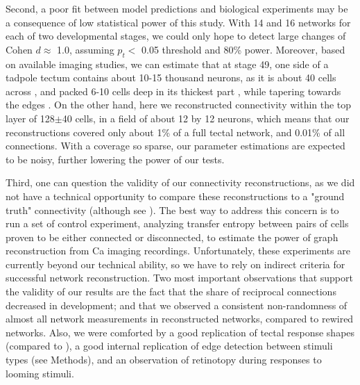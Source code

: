 \documentclass{article}
\begin{document}
Second, a poor fit between model predictions and biological experiments may be a consequence of low statistical power of this study. With 14 and 16 networks for each of two developmental stages, we could only hope to detect large changes of Cohen $d \approx$ 1.0, assuming $p_t<$ 0.05 threshold and 80\% power. Moreover, based on available imaging studies, we can estimate that at stage 49, one side of a tadpole tectum contains about 10-15 thousand neurons, as it is about 40 cells across \citep{hiramoto2009}, and packed 6-10 cells deep in its thickest part \citep{hewapathirane2008vivo}, while tapering towards the edges \citep{bollmann2009}. On the other hand, here we reconstructed connectivity within the top layer of 128$\pm$40 cells, in a field of about 12 by 12 neurons, which means that our reconstructions covered only about 1\% of a full tectal network, and 0.01\% of all connections. With a coverage so sparse, our parameter estimations are expected to be noisy, further lowering the power of our tests.

Third, one can question the validity of our connectivity reconstructions, as we did not have a technical opportunity to compare these reconstructions to a "ground truth" connectivity (although see \citealt{xu2011}). The best way to address this concern is to run a set of control experiment, analyzing transfer entropy between pairs of cells proven to be either connected or disconnected, to estimate the power of graph reconstruction from Ca imaging recordings. Unfortunately, these experiments are currently beyond our technical ability, so we have to rely on indirect criteria for successful network reconstruction. Two most important observations that support the validity of our results are the fact that the share of reciprocal connections decreased in development; and that we observed a consistent non-randomness of almost all network measurements in reconstructed networks, compared to rewired networks. Also, we were comforted by a good replication of tectal response shapes (compared to \citealt{khakhalin2014}), a good internal replication of edge detection between stimuli types (see Methods), and an observation of retinotopy during responses to looming stimuli.
\end{document}

